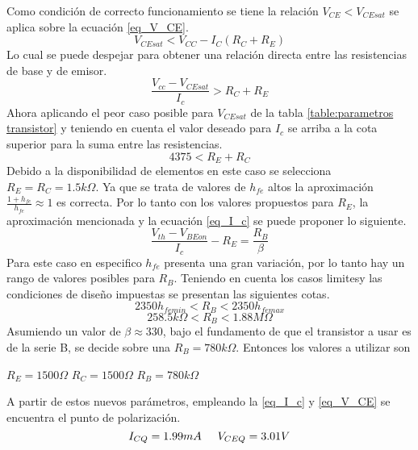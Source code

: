 Como condición de correcto funcionamiento se tiene la relación $V_{CE} < V_{CEsat}$ se aplica sobre la ecuación \ref{eq_V_CE}.
\begin{equation}
    V_{CEsat}<V_{CC}-I_C(R_C+R_E)
    \label{eq_V_CEsat}
\end{equation}
Lo cual se puede despejar para obtener una relación directa entre las resistencias de base y de emisor.
\begin{equation}
    \frac{V_{cc} -V_{CEsat}}{I_c} > R_C + R_E
    \label{eq_cota_sup_RC_RE}
\end{equation}
Ahora aplicando el peor caso posible para $V_{CEsat}$ de la tabla \ref{table:parametros transistor} y teniendo en cuenta el valor deseado para $I_c$ se arriba a la cota superior para la suma entre las resistencias.
\begin{equation}
    4375< R_E + R_C
    \label{cota_numerica}
\end{equation}
Debido a la disponibilidad de elementos en este caso se selecciona $R_E = R_C = 1.5k\Omega$.
Ya que se trata de valores de $h_{fe}$ altos la aproximación $\frac{1+h_{fe}}{h_{fe}}\approx 1$ es correcta. Por lo tanto con los valores propuestos para $R_E$, la aproximación mencionada y la ecuación \ref{eq_I_c} se puede proponer lo siguiente.
\begin{equation}
    \frac{V_{th} - V_{BEon}}{I_c} - R_E = \frac{R_B}{\beta}
    \label{eq_relacion_R_B}
\end{equation}
Para este caso en especifico $h_{fe}$ presenta una gran variación, por lo tanto hay un rango de valores posibles para $R_B$. Teniendo en cuenta los casos limitesy las condiciones de diseño impuestas se presentan las siguientes cotas.
\begin{equation}
    2350 h_{fe min} < R_B < 2350 h_{fe max}
\end{equation}
\begin{equation}
    258.5k\Omega < R_B < 1.88M\Omega
\end{equation}
Asumiendo un valor de $\beta \approx 330$, bajo el fundamento de que el transistor a usar es de la serie B, se decide sobre una $R_B = 780k\Omega$.
Entonces los valores a utilizar son
\begin{center}
    $R_E = 1500\Omega$  $R_C = 1500\Omega$ $R_B = 780 k\Omega$
\end{center}

A partir de estos nuevos parámetros, empleando la \ref{eq_I_c} y \ref{eq_V_CE} se encuentra el punto de polarización.
\begin{equation}
    I_{CQ} = 1.99mA   \hspace{5mm} V_{CEQ} = 3.01V
    \label{eq_Punto_Q_teorico}
\end{equation}

